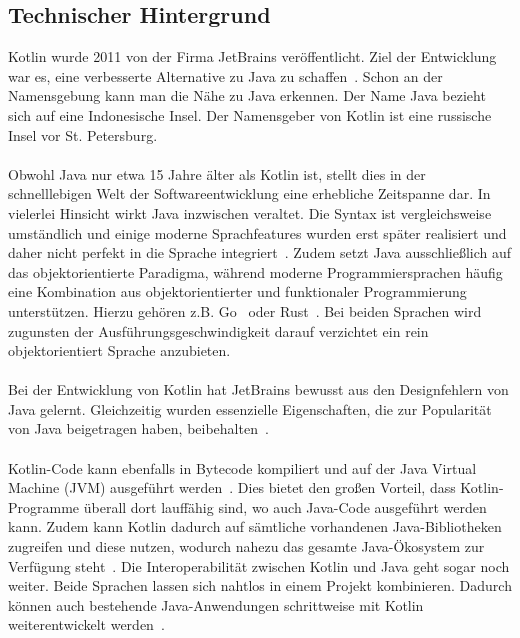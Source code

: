 \documentclass[11pt]{article}
\begin{document}
    \subsection{Technischer Hintergrund}
    Kotlin wurde 2011 von der Firma JetBrains veröffentlicht.
    Ziel der Entwicklung war es, eine verbesserte Alternative zu Java zu schaffen~\cite[19]{kotlin-handbuch}.
    Schon an der Namensgebung kann man die Nähe zu Java erkennen.
    Der Name Java bezieht sich auf eine Indonesische Insel.
    Der Namensgeber von Kotlin ist eine russische Insel vor St. Petersburg.\\
    \\
    Obwohl Java nur etwa 15 Jahre älter als Kotlin ist, stellt dies in der schnelllebigen Welt der Softwareentwicklung eine erhebliche Zeitspanne dar.
    In vielerlei Hinsicht wirkt Java inzwischen veraltet.
    Die Syntax ist vergleichsweise umständlich und einige moderne Sprachfeatures wurden erst später realisiert und daher nicht perfekt in die Sprache integriert~\cite[19]{kotlin-handbuch}.
    Zudem setzt Java ausschließlich auf das objektorientierte Paradigma, während moderne Programmiersprachen häufig eine Kombination aus objektorientierter und funktionaler Programmierung unterstützen.
    Hierzu gehören z.B. Go~\cite[34]{go} oder Rust~\cite[105]{rust}.
    Bei beiden Sprachen wird zugunsten der Ausführungsgeschwindigkeit darauf verzichtet ein rein objektorientiert Sprache anzubieten.\\
    \\
    Bei der Entwicklung von Kotlin hat JetBrains bewusst aus den Designfehlern von Java gelernt.
    Gleichzeitig wurden essenzielle Eigenschaften, die zur Popularität von Java beigetragen haben, beibehalten~\cite[20]{kotlin-handbuch}.\\
    \\
    Kotlin-Code kann ebenfalls in Bytecode kompiliert und auf der Java Virtual Machine (JVM) ausgeführt werden~\cite{kotlin-compile}.
    Dies bietet den großen Vorteil, dass Kotlin-Programme überall dort lauffähig sind, wo auch Java-Code ausgeführt werden kann.
    Zudem kann Kotlin dadurch auf sämtliche vorhandenen Java-Bibliotheken zugreifen und diese nutzen, wodurch nahezu das gesamte Java-Ökosystem zur Verfügung steht~\cite[20]{kotlin-handbuch}.
    Die Interoperabilität zwischen Kotlin und Java geht sogar noch weiter.
    Beide Sprachen lassen sich nahtlos in einem Projekt kombinieren.
    Dadurch können auch bestehende Java-Anwendungen schrittweise mit Kotlin weiterentwickelt werden~\cite[19-20]{kotlin-handbuch}.\\
    \\
\end{document}
